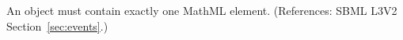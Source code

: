 An \EventAssignment object must contain exactly one MathML 
element.  (References: SBML L3V2 Section~\ref{sec:events}.)

